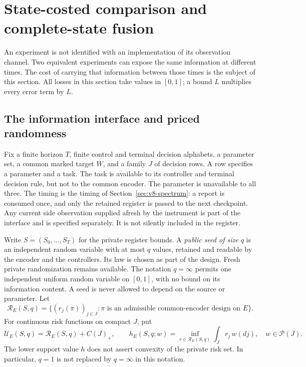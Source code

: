 \section{State-costed comparison and complete-state fusion}
\label{sec:v11-comparison}

An experiment is not identified with an implementation of its observation
channel. Two equivalent experiments can expose the same information at
different times. The cost of carrying that information between those times
is the subject of this section. All losses in this section take values in
$[0,1]$; a bound $L$ multiplies every error term by $L$.

\subsection{The information interface and priced randomness}
Fix a finite horizon $T$, finite control and terminal decision alphabets,
a parameter set, a common marked target $W$, and a family $J$ of decision
rows. A row specifies a parameter and a task. The task is available to its
controller and terminal decision rule, but not to the common encoder.
The parameter is unavailable to all three. The timing is the timing of
Section~\ref{sec:v8-spectrum}: a report is consumed once, and only the
retained register is passed to the next checkpoint. Any current side
observation supplied afresh by the instrument is part of the interface and
is specified separately. It is not silently included in the register.

Write $S=(S_0,\ldots,S_T)$ for the private register bounds. A \emph{public
seed of size $q$} is an independent random variable with at most $q$ values,
retained and readable by the encoder and the controllers. Its law is chosen
as part of the design. Fresh private randomization remains available.
The notation $q=\infty$ permits one independent uniform random variable
on $[0,1]$, with no bound on its information content. A seed is never
allowed to depend on the source or parameter. Let
\[
 \mathcal R_E(S,q)=\{(r_j(\pi))_{j\in J}:\pi
      \text{ is an admissible common-encoder design on }E\}.
\]
For continuous risk functions on compact $J$, put
\[
 \mathcal U_E(S,q)=\mathcal R_E(S,q)+C(J)_+,
 \qquad
 h_E(S,q;w)=\inf_{r\in\mathcal R_E(S,q)}\int_Jr_j\,w(dj),
 \quad w\in\mathcal P(J).
\]
The lower support value $h$ does not assert convexity of the private risk
set. In particular, $q=1$ is not replaced by $q=\infty$ in this notation.

